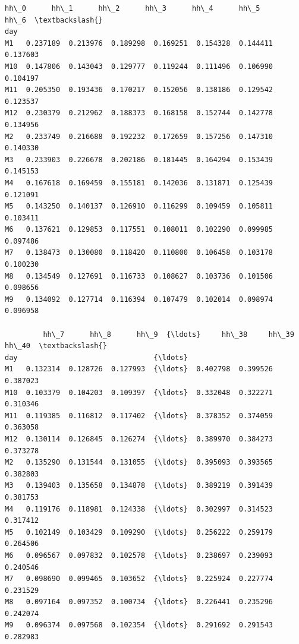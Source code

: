\documentclass[11pt]{article}
\makeatletter
\newcommand{\boxspacing}{\kern\kvtcb@left@rule\kern\kvtcb@boxsep}
\newcommand{\prompt}[4]{
        {\ttfamily\llap{{\color{#2}[#3]:\hspace{3pt}#4}}\vspace{-\baselineskip}}
    }
\makeatother
\begin{document}
            \begin{tcolorbox}[breakable, size=fbox, boxrule=.5pt, pad at break*=1mm, opacityfill=0]
\prompt{Out}{outcolor}{68}{\boxspacing}
\begin{Verbatim}[commandchars=\\\{\}]
         hh\_0      hh\_1      hh\_2      hh\_3      hh\_4      hh\_5      hh\_6  \textbackslash{}
day
M1   0.237189  0.213976  0.189298  0.169251  0.154328  0.144411  0.137603
M10  0.147806  0.143043  0.129777  0.119244  0.111496  0.106990  0.104197
M11  0.205350  0.193436  0.170217  0.152056  0.138186  0.129542  0.123537
M12  0.230379  0.212962  0.188373  0.168158  0.152744  0.142778  0.134956
M2   0.233749  0.216688  0.192232  0.172659  0.157256  0.147310  0.140330
M3   0.233903  0.226678  0.202186  0.181445  0.164294  0.153439  0.145153
M4   0.167618  0.169459  0.155181  0.142036  0.131871  0.125439  0.121091
M5   0.143250  0.140137  0.126910  0.116299  0.109459  0.105811  0.103411
M6   0.137621  0.129853  0.117551  0.108011  0.102290  0.099985  0.097486
M7   0.138473  0.130080  0.118420  0.110800  0.106458  0.103178  0.100230
M8   0.134549  0.127691  0.116733  0.108627  0.103736  0.101506  0.098656
M9   0.134092  0.127714  0.116394  0.107479  0.102014  0.098974  0.096958

         hh\_7      hh\_8      hh\_9  {\ldots}     hh\_38     hh\_39     hh\_40  \textbackslash{}
day                                {\ldots}
M1   0.132314  0.128726  0.127993  {\ldots}  0.402798  0.399526  0.387023
M10  0.103379  0.104203  0.109397  {\ldots}  0.332048  0.322271  0.310346
M11  0.119385  0.116812  0.117402  {\ldots}  0.378352  0.374059  0.363058
M12  0.130114  0.126845  0.126274  {\ldots}  0.389970  0.384273  0.373278
M2   0.135290  0.131544  0.131055  {\ldots}  0.395093  0.393565  0.382803
M3   0.139403  0.135658  0.134878  {\ldots}  0.389219  0.391439  0.381753
M4   0.119176  0.118981  0.124338  {\ldots}  0.302997  0.314523  0.317412
M5   0.102149  0.103429  0.109290  {\ldots}  0.256222  0.259179  0.264506
M6   0.096567  0.097832  0.102578  {\ldots}  0.238697  0.239093  0.240546
M7   0.098690  0.099465  0.103652  {\ldots}  0.225924  0.227774  0.231529
M8   0.097164  0.097352  0.100734  {\ldots}  0.226441  0.235296  0.242074
M9   0.096374  0.097568  0.102354  {\ldots}  0.291692  0.291543  0.282983


\end{Verbatim}
\end{tcolorbox}
\end{document}
